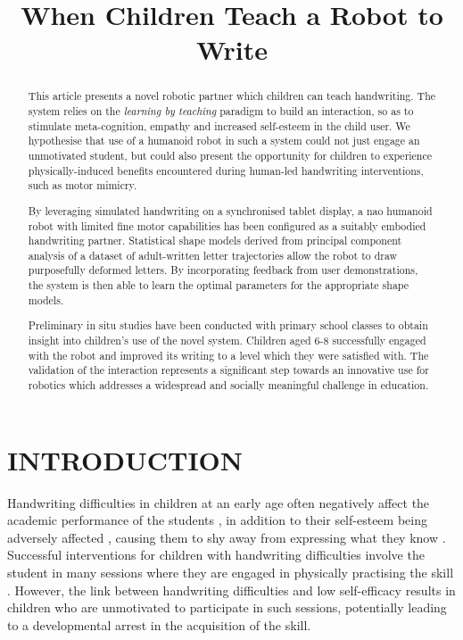 \documentclass{sig-alternate}
\title{\LARGE \bf
When Children Teach a Robot to Write
}
\begin{document}
\maketitle

\begin{abstract}

This article presents a novel robotic partner which children can teach
handwriting.  The system relies on the \emph{learning by teaching} paradigm to
build an interaction, so as to stimulate meta-cognition, empathy and
increased self-esteem in the child user.  We hypothesise that use of a
humanoid robot in such a system could not just engage an unmotivated student,
but could also present the opportunity for children to experience
physically-induced benefits encountered during human-led handwriting
interventions, such as motor mimicry.

By leveraging simulated handwriting on a synchronised tablet display, a {\sc
nao} humanoid robot with limited fine motor capabilities has been configured as
a suitably embodied handwriting partner. Statistical shape models derived from
principal component analysis of a dataset of adult-written letter trajectories
allow the robot to draw purposefully deformed letters. By incorporating feedback
from user demonstrations, the system is then able to learn the optimal
parameters for the appropriate shape models. 

Preliminary in situ studies have been conducted with primary school classes to
obtain insight into children's use of the novel system.  Children aged 6-8
successfully engaged with the robot and improved its writing to a level which
they were satisfied with. The validation of the interaction represents a
significant step towards an innovative use for robotics which addresses a
widespread and socially meaningful challenge in education. 

\end{abstract}


\section{INTRODUCTION}

Handwriting difficulties in children at an early age often negatively affect
the academic performance of the students \cite{Christensen2005}, in addition to
their self-esteem being adversely affected \cite{Malloy1995}, causing them to
shy away from expressing what they know \cite{Medwell2008}.
Successful interventions for children with handwriting difficulties involve the
student in many sessions where they are engaged in physically practising the
skill \cite{Hoy2011}. However, the link between handwriting difficulties and low
self-efficacy \cite{Engel-Yeger2009} results in children who are unmotivated to
participate in such sessions, potentially leading to a developmental arrest in
the acquisition of the skill. 
\end{document}
